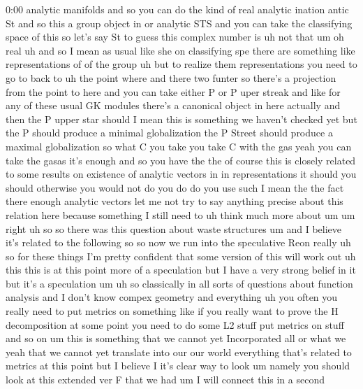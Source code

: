 \begin{unfinished}{0:00}
analytic  manifolds  and  so  you  can  do  the
kind  of  real  analytic
ination  antic  St  and  so  this  a  group
object  in  or  analytic  STS  and  you  can
take  the  classifying  space  of  this  so
let's  say  St
to  guess  this  complex  number  is  uh  not
that  um  oh  real
uh  and
so  I  mean  as  usual  like  she  on
classifying  spe  there  are  something  like
representations  of  of  the  group  uh  but
to  realize  them  representations  you  need
to  go  to  back
to  uh  the  point  where  and  there  two
funter  so  there's  a  projection  from  the
point  to  here  and  you  can  take  either  P
or  P  uper
streak  and  like  for  any  of  these  usual
GK  modules  there's  a  canonical  object  in
here
actually  and  then  the  P  upper  star
should  I  mean  this  is  something  we
haven't  checked  yet  but  the  P  should
produce  a  minimal  globalization  the  P
Street  should  produce  a  maximal
globalization  so  what  C  you  take  you
take  C  with  the  gas  yeah  you  can  take
the  gasas  it's  enough  and  so  you  have
the
the  of  course  this  is  closely  related  to
some  results  on  existence  of  analytic
vectors  in  in
representations  it  should  you  should
otherwise  you  would  not  do  you  do  do  you
use  such  I  mean  the  the  fact  there
enough  analytic
vectors  let  me  not  try  to  say  anything
precise  about  this  relation  here  because
something  I  still  need  to  uh  think  much
more  about
um
um  right  uh
so  so  there  was  this  question  about
waste  structures  um  and  I  believe  it's
related  to  the  following
so  so  now  we  run  into  the  speculative
Reon  really  uh  so  for  these
things  I'm  pretty  confident  that  some
version  of  this  will  work  out  uh  this
this  is  at  this  point  more  of  a
speculation  but
I  have  a  very  strong  belief  in  it  but
it's  a  speculation
um  uh  so  classically  in  all  sorts  of
questions  about  function  analysis  and  I
don't  know  compex  geometry  and
everything  uh  you  often  you  really  need
to  put  metrics  on  something  like  if  you
really  want  to  prove  the  H  decomposition
at  some  point  you  need  to  do  some  L2
stuff  put  metrics  on  stuff  and  so  on  um
this  is  something  that  we  cannot  yet
Incorporated  all  or  what  we  yeah  that  we
cannot  yet  translate  into  our  our  world
everything  that's  related  to  metrics  at
this  point  but  I  believe  I  it's  clear
way  to  look  um  namely  you  should  look  at
this  extended  ver  F  that  we
had  um  I  will  connect  this  in  a  second

\end{unfinished}
